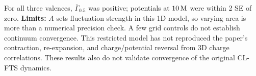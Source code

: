 For all three valences, $\overline\Gamma_{0.5}$ was positive; potentials at $10\,\mathrm{M}$ were within 2 SE of zero.
\textbf{Limits:} $A$ sets fluctuation strength in this 1D model, so varying area is more than
a numerical precision check. A few grid controls do not establish continuum convergence.
This restricted model has not reproduced the paper's contraction, re-expansion, and charge/potential reversal
from 3D charge correlations. These results also do not validate convergence of the original CL-FTS dynamics.
